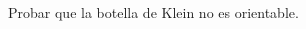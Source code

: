 \documentclass[twoside]{article}
\begin{document}
\newpage

\begin{ejercicio}{9.13}
Probar que la botella de Klein no es orientable.
\end{ejercicio}
\begin{solucion}
\end{solucion}
\newpage

\begin{ejercicio}{9.15}
\end{ejercicio}
\begin{solucion}
\end{solucion}
\newpage

\begin{ejercicio}{9.16}
\end{ejercicio}
\begin{solucion}
\end{solucion}
\newpage

\begin{ejercicio}{9.17}
\end{ejercicio}
\begin{solucion}
\end{solucion}
\newpage

\begin{ejercicio}{9.18}
\end{ejercicio}
\begin{solucion}
\end{solucion}
\end{document}
